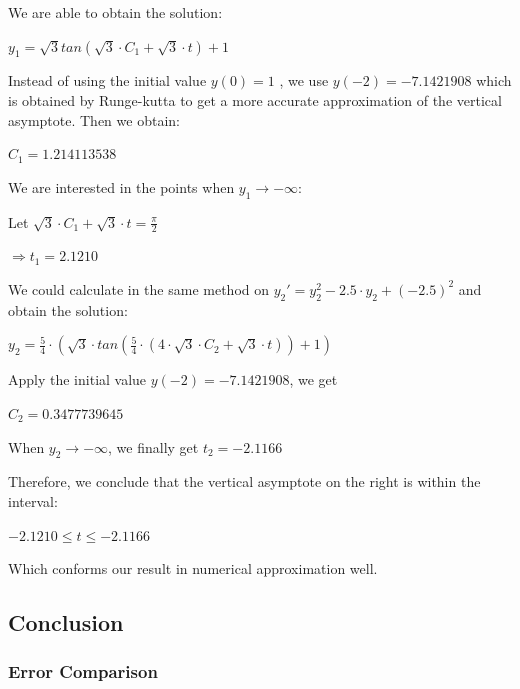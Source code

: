 \documentclass[11pt,a4paper]{article}
\begin{document}
\begin{multicols}{2}
	We are able to obtain the solution: 
	
	\begin{center}
		$y_1=\sqrt{3}tan({\sqrt{3} \cdot C_1+\sqrt{3} \cdot t})+1$
	\end{center}

	Instead of using the initial value $y(0)=1$ , we use $y(-2)=-7.1421908$ which is obtained by Runge-kutta to get a more accurate approximation of the vertical asymptote. Then we obtain: 
	
	\begin{center}
		$C_1=1.214113538$
	\end{center}

	We are interested in the points when $y_1 \rightarrow -\infty$:

	\begin{center}
		Let $\sqrt{3} \cdot C_1+\sqrt{3} \cdot t=\frac{\pi}{2}$

		$\Rightarrow t_1 = 2.1210$
	\end{center}

	We could calculate in the same method on $y_2' = y_2 ^ 2-2.5 \cdot y_2+(-2.5)^2$ and obtain the solution:

	\begin{center}
		$y_2=\frac{5}{4} \cdot (\sqrt{3} \cdot tan(\frac{5}{4} \cdot (4 \cdot \sqrt{3} \cdot C_2+\sqrt{3} \cdot t))+1)$
	\end{center}

	 Apply the initial value $y(-2) = -7.1421908$, we get 
	\begin{center}
		$C_2 = 0.3477739645$
	\end{center}

	When $y_2 \rightarrow -\infty$, we finally get $t_2=-2.1166$

	Therefore, we conclude that the vertical asymptote on the right is within the interval:

	\begin{center}
		$-2.1210 \leq t \leq -2.1166$
	\end{center}

	Which conforms our result in numerical approximation well.

\end{multicols}

\newpage
\subsection{Conclusion}

\subsubsection{Error Comparison}
 
\end{document}
